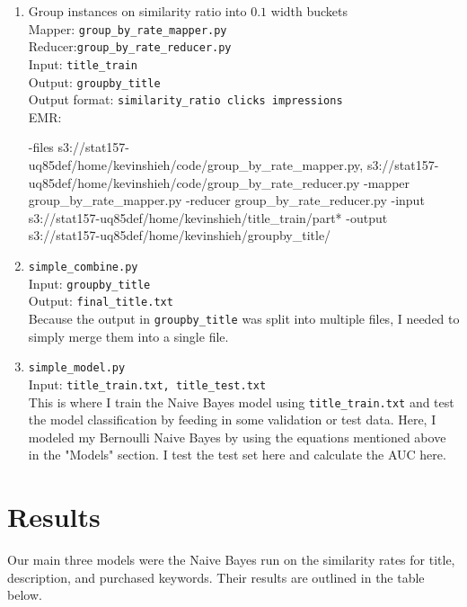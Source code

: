 \documentclass[11pt]{article}
\begin{document}
\begin{enumerate}
\item
Group instances on similarity ratio into $0.1$ width buckets \\
Mapper: \texttt{group\_by\_rate\_mapper.py} \\
Reducer:\texttt{group\_by\_rate\_reducer.py} \\
Input: \texttt{title\_train} \\
Output: \texttt{groupby\_title} \\
Output format: \texttt{similarity\_ratio clicks impressions} \\
EMR: \begin{spverbatim}
-files s3://stat157-uq85def/home/kevinshieh/code/group_by_rate_mapper.py,
s3://stat157-uq85def/home/kevinshieh/code/group_by_rate_reducer.py 
-mapper group_by_rate_mapper.py -reducer group_by_rate_reducer.py 
-input s3://stat157-uq85def/home/kevinshieh/title_train/part* 
-output s3://stat157-uq85def/home/kevinshieh/groupby_title/
\end{spverbatim}

\item
\texttt{simple\_combine.py}  \\
Input: \texttt{groupby\_title} \\
Output: \texttt{final\_title.txt} \\
Because the output in \texttt{groupby\_title} was split into multiple files, I needed to simply merge them into a single file. \\

\item
\texttt{simple\_model.py} \\
Input: \texttt{title\_train.txt, title\_test.txt} \\
This is where I train the Naive Bayes model using \texttt{title\_train.txt} and test the model classification by feeding in some validation or test data. Here, I modeled my Bernoulli Naive Bayes by using the equations mentioned above in the "Models" section. I test the test set here and calculate the AUC here. \\

\end{enumerate}

\section*{Results}
Our main three models were the Naive Bayes run on the similarity rates for title, description, and purchased keywords. Their results are outlined in the table below. \\
\end{document}
